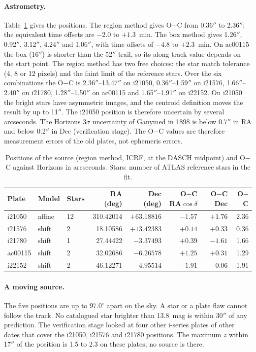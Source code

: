 \documentclass[11pt]{article}
\newcommand{\as}{$''$}
\begin{document}
\paragraph{Astrometry.} Table~\ref{tab:ast} gives the positions. The region method gives O$-$C from 0.36\as{} to 2.36\as; the equivalent time offsets are $-2.0$ to $+1.3$~min. The box method gives 1.26\as, 0.92\as, 3.12\as, 4.24\as{} and 1.06\as, with time offsets of $-4.8$ to $+2.3$~min. On ac00115 the box (16\as) is shorter than the 52\as{} trail, so its along-track value depends on the start point. The region method has two free choices: the star match tolerance (4, 8 or 12 pixels) and the faint limit of the reference stars. Over the six combinations the O$-$C is 2.36\as--13.47\as{} on i21050, 0.36\as--1.59\as{} on i21576, 1.66\as--2.40\as{} on i21780, 1.28\as--1.50\as{} on ac00115 and 1.65\as--1.91\as{} on i22152. On i21050 the bright stars have asymmetric images, and the centroid definition moves the result by up to 11\as. The i21050 position is therefore uncertain by several arcseconds. The Horizons $3\sigma$ uncertainty of Ganymed in 1898 is below 0.7\as{} in RA and below 0.2\as{} in Dec (verification stage). The O$-$C values are therefore measurement errors of the old plates, not ephemeris errors.

\begin{table}[h]
\centering\small
\begin{tabular}{lllrrrrr}\toprule
Plate & Model & Stars & RA (deg) & Dec (deg) & O$-$C RA$\cos\delta$ & O$-$C Dec & O$-$C \\\midrule
i21050 & affine & 12 & 310.42014 & $+63.18816$ & $-1.57$ & $+1.76$ & 2.36 \\
i21576 & shift & 2 & 18.10586 & $+13.42383$ & $+0.14$ & $+0.33$ & 0.36 \\
i21780 & shift & 1 & 27.44422 & $-3.37493$ & $+0.39$ & $-1.61$ & 1.66 \\
ac00115 & shift & 2 & 32.02686 & $-6.26578$ & $+1.25$ & $+0.31$ & 1.29 \\
i22152 & shift & 2 & 46.12271 & $-4.95514$ & $-1.91$ & $-0.06$ & 1.91 \\\bottomrule
\end{tabular}
\caption{Positions of the source (region method, ICRF, at the DASCH midpoint) and O$-$C against Horizons in arcseconds. Stars: number of ATLAS reference stars in the fit.}
\label{tab:ast}
\end{table}

\paragraph{A moving source.} The five positions are up to $97.0^\circ$ apart on the sky. A star or a plate flaw cannot follow the track. No catalogued star brighter than 13.8~mag is within 30\as{} of any prediction. The verification stage looked at four other i-series plates of other dates that cover the i21050, i21576 and i21780 positions. The maximum $z$ within 17\as{} of the position is 1.5 to 2.3 on these plates; no source is there.
\end{document}

